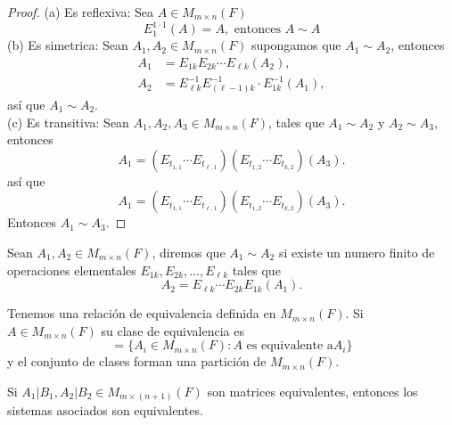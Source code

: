 \documentclass[12pt,a4paper]{book}
\begin{document}
    \begin{proof}
        (a) Es reflexiva: Sea $A\in M_{m\times n}(F)$
        \begin{equation*}
            E_{1}^{1\cdot1}(A)=A,\text{ entonces }A\sim A
        \end{equation*}
        (b) Es simetrica: Sean $A_{1},A_{2}\in M_{m\times n}(F)$ supongamos que $A_{1}\sim A_{2}$,
        entonces
        \begin{align*}
            A_{1}&=E_{1k}E_{2k}\cdots E_{\ell k}(A_{2}),\\
            A_{2}&=E_{\ell k}^{-1}E_{(\ell-1)k}^{-1}\cdot E_{1k}^{-1}(A_{1}),
        \end{align*}
        así que $A_{1}\sim A_{2}$.\\
        (c) Es transitiva: Sean $A_{1},A_{2},A_{3}\in M_{m\times n}(F)$, tales que $A_{1}\sim A_{2}$ y $A_{2}\sim A_{3}$,
        entonces
        \begin{equation*}
            A_{1}=(E_{t_{1,1}}\cdots E_{t_{\ell,1}})(E_{t_{1,2}}\cdots E_{t_{k,2}})(A_{3}).
        \end{equation*}
        así que
        \begin{equation*}
            A_{1}=(E_{t_{1,1}}\cdots E_{t_{\ell,1}})(E_{t_{1,2}}\cdots E_{t_{k,2}})(A_{3}).
        \end{equation*}
        Entonces $A_{1}\sim A_{3}$.
    \end{proof}

    \begin{definicion}
        Sean $A_{1},A_{2}\in M_{m\times n}(F)$, diremos que $A_{1}\sim A_{2}$ si existe un numero finito de
        operaciones elementales $E_{1k},E_{2k},\dots,E_{\ell k}$ tales que
        \begin{equation*}
            A_{2}=E_{\ell k}\cdots E_{2k}E_{1k}(A_{1}).
        \end{equation*}
    \end{definicion}

    Tenemos una relación de equivalencia definida en $M_{m\times n}(F)$. Si $A\in M_{m\times n}(F)$ su clase
    de equivalencia es
    \begin{equation*}
        [A]=\biggl\{A_{i}\in M_{m\times n}(F):A\text{ es equivalente a} A_{i}\biggr\}
    \end{equation*}
    y el conjunto de clases forman una partición de $M_{m\times n}(F)$.

    \begin{proposicion}
        Si $A_{1}|B_{1},A_{2}|B_{2}\in M_{m\times(n+1)}(F)$ son matrices equivalentes, entonces los sistemas asociados
        son equivalentes.
    \end{proposicion}
\end{document}
